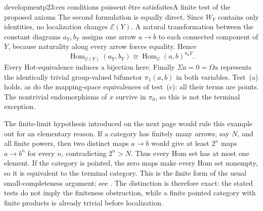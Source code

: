 \begin{dcomment}{development}{p23:ces conditions puissent être satisfaites}{A finite test of the proposed axioms}
The second formulation is equally direct. Since $W_Y$ contains only identities, no localization changes $\mathcal E(Y)$. A natural transformation between the constant diagrams $a_Y,b_Y$ assigns one arrow $a\to b$ to each connected component of $Y$, because naturality along every arrow forces equality. Hence
\[
 \operatorname{Hom}_{\mathcal E(Y)}(a_Y,b_Y)
 \cong\operatorname{Hom}_{\mathcal E}(a,b)^{\pi_0Y}.
\]
Every Hot-equivalence induces a bijection here. Finally $\Sigma a=0=\Omega a$ represents the identically trivial group-valued bifunctor $\pi_1(a,b)$ in both variables. Test~(a) holds, as do the mapping-space equivalences of test~(c): all their terms are points. The nontrivial endomorphisms of $x$ survive in $\pi_0$, so this is not the terminal exception.

The finite-limit hypothesis introduced on the next page would rule this example out for an elementary reason. If a category has finitely many arrows, say $N$, and all finite powers, then two distinct maps $a\to b$ would give at least $2^n$ maps $a\to b^n$ for every $n$, contradicting $2^n>N$. Thus every Hom set has at most one element. If the category is pointed, the zero maps make every Hom set nonempty, so it is equivalent to the terminal category. This is the finite form of the usual small-completeness argument; see \citet[Exercise 6.3.23(d)]{Leinster2014}. The distinction is therefore exact: the stated tests do not imply the finiteness obstruction, while a finite pointed category with finite products is already trivial before localization.
\end{dcomment}

